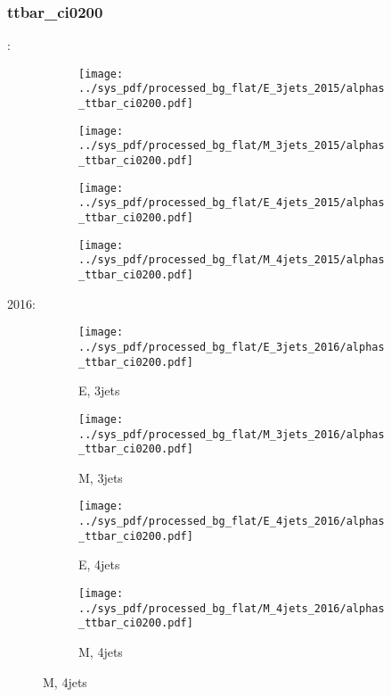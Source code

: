 \documentclass{beamer}
\begin{document}
\begin{frame}
\frametitle{ttbar_ci0200}
\fontsize{5}{1}:
\begin{figure}
\centering
\begin{subfigure}[b]{0.24\textwidth}
\texttt{[image: ../sys\_pdf/processed\_bg\_flat/E\_3jets\_2015/alphas\_ttbar\_ci0200.pdf]}
\end{subfigure}
\begin{subfigure}[b]{0.24\textwidth}
\texttt{[image: ../sys\_pdf/processed\_bg\_flat/M\_3jets\_2015/alphas\_ttbar\_ci0200.pdf]}
\end{subfigure}
\begin{subfigure}[b]{0.24\textwidth}
\texttt{[image: ../sys\_pdf/processed\_bg\_flat/E\_4jets\_2015/alphas\_ttbar\_ci0200.pdf]}
\end{subfigure}
\begin{subfigure}[b]{0.24\textwidth}
\texttt{[image: ../sys\_pdf/processed\_bg\_flat/M\_4jets\_2015/alphas\_ttbar\_ci0200.pdf]}
\end{subfigure}
\end{figure}
2016:
\begin{figure}
\centering
\begin{subfigure}[b]{0.24\textwidth}
\texttt{[image: ../sys\_pdf/processed\_bg\_flat/E\_3jets\_2016/alphas\_ttbar\_ci0200.pdf]}
\captionsetup{font=tiny}
\caption{E, 3jets}
\end{subfigure}
\begin{subfigure}[b]{0.24\textwidth}
\texttt{[image: ../sys\_pdf/processed\_bg\_flat/M\_3jets\_2016/alphas\_ttbar\_ci0200.pdf]}
\captionsetup{font=tiny}
\caption{M, 3jets}
\end{subfigure}
\begin{subfigure}[b]{0.24\textwidth}
\texttt{[image: ../sys\_pdf/processed\_bg\_flat/E\_4jets\_2016/alphas\_ttbar\_ci0200.pdf]}
\captionsetup{font=tiny}
\caption{E, 4jets}
\end{subfigure}
\begin{subfigure}[b]{0.24\textwidth}
\texttt{[image: ../sys\_pdf/processed\_bg\_flat/M\_4jets\_2016/alphas\_ttbar\_ci0200.pdf]}
\captionsetup{font=tiny}
\caption{M, 4jets}
\end{subfigure}
\end{figure}
\end{frame}
\end{document}
